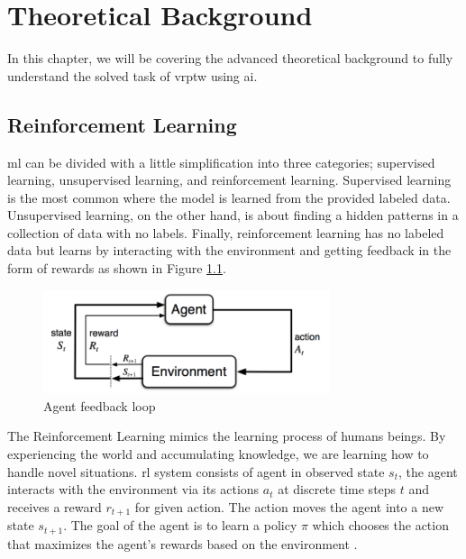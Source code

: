 \chapter{Theoretical Background}\label{theoretical_background}

In this chapter, we will be covering the advanced theoretical background to fully understand the solved task of \gls{vrptw} using \gls{ai}.

\section{Reinforcement Learning}\label{rl}
    \gls{ml} can be divided with a little simplification into three categories; supervised learning, unsupervised learning, and reinforcement learning. Supervised learning is the most common where the model is learned from the provided labeled data. Unsupervised learning, on the other hand, is about finding a hidden patterns in a collection of data with no labels. Finally, reinforcement learning has no labeled data but learns by interacting with the environment and getting feedback in the form of rewards as shown in Figure \ref{fig:rl-loop}. 
    
    \begin{figure}[ht]
        \centering
        \includegraphics[width=0.75\textwidth]{resources/theoretical-background/rl-loop.png}
        \caption{Agent feedback loop\cite{rl-intro}}
        \label{fig:rl-loop}
    \end{figure}
    
    The Reinforcement Learning mimics the learning process of humans beings. By experiencing the world and accumulating knowledge, we are learning how to handle novel situations. \gls{rl} system consists of agent in observed state $s_t$, the agent interacts with the environment via its actions $a_t$ at discrete time steps $t$ and receives a reward $r_{t+1}$ for given action. The action moves the agent into a new state $s_{t+1}$. The goal of the agent is to learn a policy $\pi$ which chooses the action that maximizes the agent's rewards based on the environment \cite{rl-intro}. 
    

